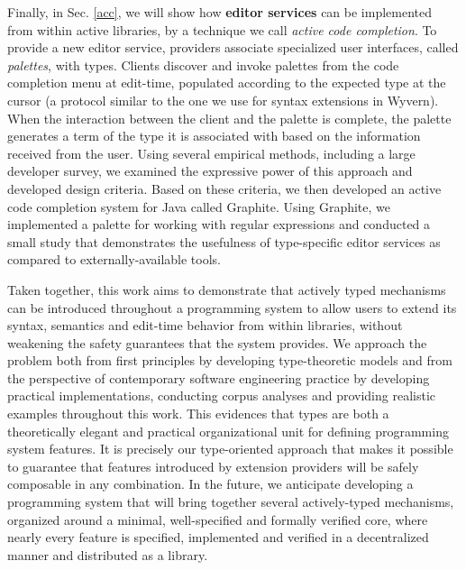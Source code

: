 Finally, in Sec. \ref{acc}, we will show how \textbf{editor services} can be implemented from within active libraries, by a technique we call \emph{active code completion}. To provide a new editor service, providers associate
specialized user interfaces, called \emph{palettes}, with types. Clients discover and invoke palettes from the code completion menu at edit-time, populated according to the expected type at the cursor (a protocol similar to the one we use for syntax extensions in Wyvern). When the interaction between the client and the palette is complete, the palette generates a term of the type it is associated with based on the information received from the user. Using several empirical
methods, including a large developer survey, we examined the expressive power of this approach and developed design criteria. Based on these criteria, we then developed an active code completion system for Java called Graphite. Using Graphite,
we implemented a palette for working with regular expressions and conducted a small study that demonstrates the usefulness of type-specific editor services as compared to externally-available tools.

Taken together, this work aims to demonstrate that actively typed mechanisms can be introduced throughout a programming system to allow users to extend its syntax, semantics and edit-time behavior from within libraries, without  weakening the safety guarantees that the system provides. We approach the problem both from first principles by developing type-theoretic models and from the perspective of contemporary software engineering practice by developing practical implementations, conducting corpus analyses and providing realistic examples throughout this work. This evidences that types are both a theoretically elegant and practical organizational unit for defining programming system features. It is precisely our type-oriented approach that makes it possible to guarantee that features introduced by extension providers will be safely composable in any combination. In the future, we anticipate developing a programming system that will bring together several actively-typed mechanisms, organized around a minimal, well-specified and formally verified core, where nearly every feature is specified, implemented and verified in a decentralized manner and distributed as a library. 


